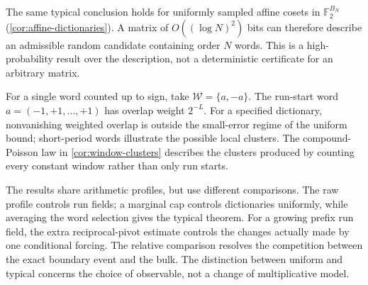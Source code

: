 The same typical conclusion holds for uniformly sampled affine cosets
in $\mathbb F_2^{B_N}$ (\cref{cor:affine-dictionaries}). A matrix of
$O((\log N)^2)$ bits can therefore describe an admissible random
candidate containing order $N$ words. This is a high-probability result
over the description, not a deterministic certificate for an arbitrary
matrix.

For a single word counted up to sign, take $\mathcal W=\{a,-a\}$.
The run-start word $a=(-1,+1,\ldots,+1)$ has overlap weight $2^{-L}$.
For a specified dictionary, nonvanishing weighted overlap is outside
the small-error regime of the uniform bound;
short-period words illustrate the possible local clusters.
The compound-Poisson law in \cref{cor:window-clusters} describes the
clusters produced by counting every constant window rather than only
run starts.

The results share arithmetic profiles, but use different comparisons.
The raw profile controls run fields; a marginal cap controls dictionaries
uniformly, while averaging the word selection gives the typical theorem.
For a growing prefix run field, the extra reciprocal-pivot estimate
controls the changes actually made by one conditional forcing.
The relative comparison resolves the competition between the exact
boundary event and the bulk. The distinction between uniform and typical
concerns the choice of observable, not a change of multiplicative model.

